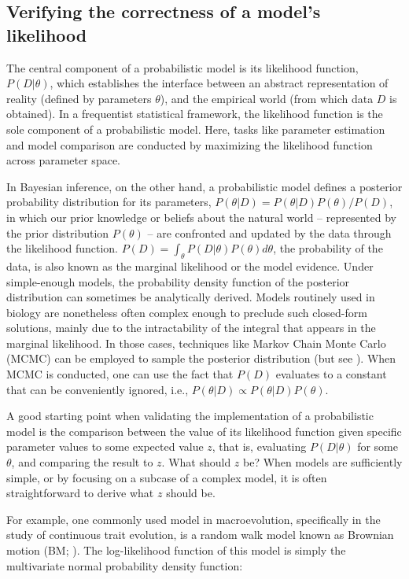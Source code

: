 \documentclass[oneside,twocolumn]{article}
\begin{document}
\subsection*{Verifying the correctness of a model's likelihood}

The central component of a probabilistic model is its likelihood
function, $P(D|\theta)$, which establishes the
interface between an abstract representation of reality (defined by parameters $\theta$), and the
empirical world (from which data $D$ is obtained).
In a frequentist statistical framework, the likelihood function is the sole
component of a probabilistic model.
Here, tasks like parameter estimation and model comparison are conducted
by maximizing the likelihood function across parameter
space.

In Bayesian inference, on the other hand, a probabilistic model
defines a posterior probability distribution for its parameters,
$P(\theta|D) = P(\theta|D)P(\theta) / P(D)$, in which our prior
knowledge or beliefs about the natural world -- represented by the prior
distribution $P(\theta)$ -- are confronted and updated by the data through the
likelihood function.
$P(D) = \int_\theta P(D|\theta)P(\theta)d\theta$, the probability of
the data, is also known as the marginal likelihood or the model evidence.
Under simple-enough models, the probability density function of the posterior distribution can sometimes be analytically
derived.
Models routinely used in biology are nonetheless often complex enough
to preclude such closed-form solutions, mainly due to the
intractability of the integral that appears in the marginal
likelihood.
In those cases, techniques like Markov Chain Monte Carlo (MCMC) can be employed to
sample the posterior distribution (but see \citealt{zhang18}).
When MCMC is conducted, one can use the fact that $P(D)$
evaluates to a constant that can be conveniently ignored, i.e., $P(\theta|D) \propto P(\theta|D)P(\theta)$.

A good starting point when validating the implementation of a probabilistic
model is the comparison between the value of its likelihood function given
specific parameter values to some expected value $z$, that
is, evaluating $P(D|\theta)$ for some $\theta$, and comparing the
result to $z$.
What should $z$ be? When models are sufficiently simple, or by focusing
on a subcase of a complex model, it is often straightforward to derive
what $z$ should be.

For example, one commonly used model in macroevolution, specifically in the study
of continuous trait evolution, is a random walk model known as
Brownian motion (BM; \citealt{felsenstein73}).
The log-likelihood function of this model is simply the multivariate
normal probability density function:
\end{document}

